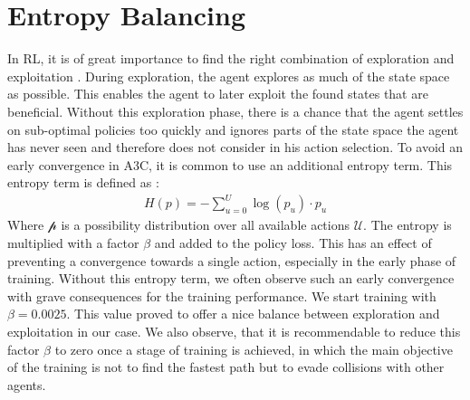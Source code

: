 \section{Entropy Balancing}\label{entropy_balancing_hyperparameter}
In RL, it is of great importance to find the right combination of exploration and exploitation \cite{explorationexploitation}. During exploration, the agent explores as much of the state space as possible. This enables the agent to later exploit the found states that are beneficial. Without this exploration phase, there is a chance that the agent settles on sub-optimal policies too quickly and ignores parts of the state space the agent has never seen and therefore does not consider in his action selection. To avoid an early convergence in A3C, it is common to use an additional entropy term. This entropy term is defined as \cite{a3c}:
\begin{gather*}
H(p) = -\sum_{u=0}^{U}\log(p_{u})\cdot p_{u}
\end{gather*}
Where $\mathcal{p}$ is a possibility distribution over all available actions $\mathcal{U}$. The entropy is multiplied with a factor $\beta$ and added to the policy loss. This has an effect of preventing a convergence towards a single action, especially in the early phase of training. Without this entropy term, we often observe such an early convergence with grave consequences for the training performance. We start training with $\beta=0.0025$. This value proved to offer a nice balance between exploration and exploitation in our case. We also observe, that it is recommendable to reduce this factor $\beta$ to zero once a stage of training is achieved, in which the main objective of the training is not to find the fastest path but to evade collisions with other agents.
